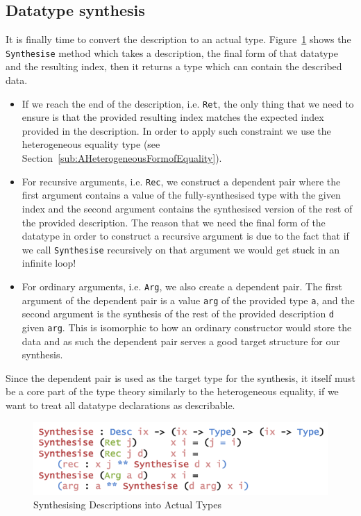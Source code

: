 \documentclass{ituthesis}
\newcommand{\ttconstructor}[1]{\textcolor{constructor-color}{\texttt{#1}}}
\newcommand{\ttdec}[1]{\textcolor{declared-var-color}{\texttt{#1}}}
\newcommand{\ttvar}[1]{\textcolor{local-var-color}{\texttt{#1}}}
\begin{document}
\subsection{Datatype synthesis}
\label{sub:DatatypeSynthesis}
It is finally time to convert the description to an actual type. Figure~\ref{fig:synthdata} shows the \ttdec{Synthesise} method which takes a description, the final form of that datatype and the resulting index, then it returns a type which can contain the described data.

\begin{itemize}
  \item If we reach the end of the description, i.e. \ttconstructor{Ret}, the only thing that we need to ensure is that the provided resulting index matches the expected index provided in the description. In order to apply such constraint we use the heterogeneous equality type (see Section~\ref{sub:AHeterogeneousFormofEquality}).
  \item For recursive arguments, i.e. \ttconstructor{Rec}, we construct a dependent pair where the first argument contains a value of the fully-synthesised type with the given index and the second argument contains the synthesised version of the rest of the provided description. The reason that we need the final form of the datatype in order to construct a recursive argument is due to the fact that if we call \ttdec{Synthesise} recursively on that argument we would get stuck in an infinite loop!
  \item For ordinary arguments, i.e. \ttconstructor{Arg}, we also create a dependent pair. The first argument of the dependent pair is a value \ttvar{arg} of the provided type \ttvar{a}, and the second argument is the synthesis of the rest of the provided description \ttvar{d} given \ttvar{arg}. This is isomorphic to how an ordinary constructor would store the data and as such the dependent pair serves a good target structure for our synthesis.
\end{itemize}
Since the dependent pair is used as the target type for the synthesis, it itself must be a core part of the type theory similarly to the heterogeneous equality, if we want to treat all datatype declarations as describable.

\begin{figure}[ht]
\begin{center}
    \includegraphics[scale=0.5]{Figures/SynthesisingData.png}
\end{center}
\caption{Synthesising Descriptions into Actual Types}
\label{fig:synthdata}
\end{figure}
\end{document}
